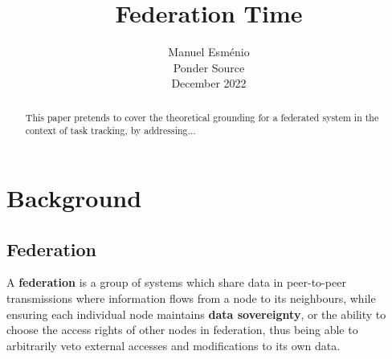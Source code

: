 \documentclass[journal]{IEEEtran}
\begin{document}
\title{Federation Time}

\author{Manuel Esménio \\ Ponder Source \\ December 2022}%

	
\maketitle
\thispagestyle{empty}

\begin{abstract}
	 \cite{Eugene_A._Feinberg-MDP} This paper pretends to cover the theoretical grounding for a federated system in the context of task tracking, by addressing...
\end{abstract}


\IEEEpeerreviewmaketitle

\section{Background}

\subsection{Federation}

A \textbf{federation} is a group of systems which share data in peer-to-peer transmissions where information flows from a node to its neighbours, while ensuring each individual node maintains \textbf{data sovereignty}, or the ability to choose the access rights of other nodes in federation, thus being able to arbitrarily veto external accesses and modifications  to its own data. 
\end{document}
